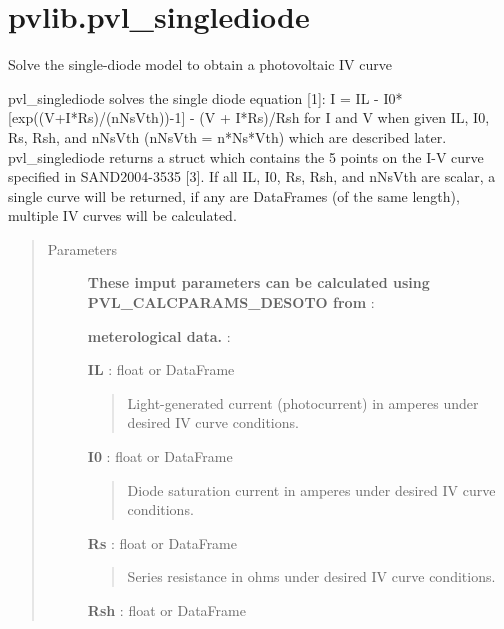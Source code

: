 \documentclass[letterpaper,10pt,english]{sphinxmanual}
\begin{document}
\section{pvlib.pvl\_singlediode}
\label{stubs/pvlib.pvl_singlediode::doc}\label{stubs/pvlib.pvl_singlediode:pvlib-pvl-singlediode}

\begin{fulllineitems}
\label{stubs/pvlib.pvl_singlediode:pvlib.pvl_singlediode}
Solve the single-diode model to obtain a photovoltaic IV curve

pvl\_singlediode solves the single diode equation {[}1{]}:
I = IL - I0*{[}exp((V+I*Rs)/(nNsVth))-1{]} - (V + I*Rs)/Rsh
for I and V when given IL, I0, Rs, Rsh, and nNsVth (nNsVth = n*Ns*Vth) which
are described later. pvl\_singlediode returns a struct which contains
the 5 points on the I-V curve specified in SAND2004-3535 {[}3{]}. 
If all IL, I0, Rs, Rsh, and nNsVth are scalar, a single curve
will be returned, if any are DataFrames (of the same length), multiple IV
curves will be calculated.
\begin{quote}\begin{description}
\item[{Parameters}] \leavevmode
\textbf{These imput parameters can be calculated using PVL\_CALCPARAMS\_DESOTO from} :

\textbf{meterological data.} :

\textbf{IL} : float or DataFrame
\begin{quote}

Light-generated current (photocurrent) in amperes under desired IV
curve conditions.
\end{quote}

\textbf{I0} : float or DataFrame
\begin{quote}

Diode saturation current in amperes under desired IV curve
conditions.
\end{quote}

\textbf{Rs} : float or DataFrame
\begin{quote}

Series resistance in ohms under desired IV curve conditions.
\end{quote}

\textbf{Rsh} : float or DataFrame
\begin{quote}


\end{quote}
\end{description}
\end{quote}
\end{fulllineitems}
\end{document}
